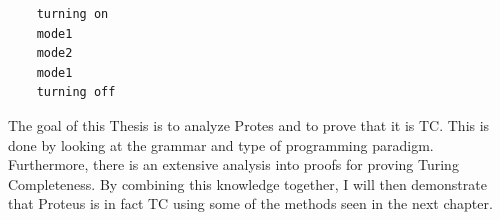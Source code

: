 \begin{verbatim}
    turning on
    mode1
    mode2
    mode1
    turning off
\end{verbatim}

The goal of this Thesis is to analyze Protes and to prove that it is TC.
This is done by looking at the grammar and type of programming paradigm.
Furthermore, there is an extensive analysis into proofs for proving Turing Completeness.
By combining this knowledge together, I will then demonstrate that Proteus is in fact TC using some of the methods seen in the next chapter.